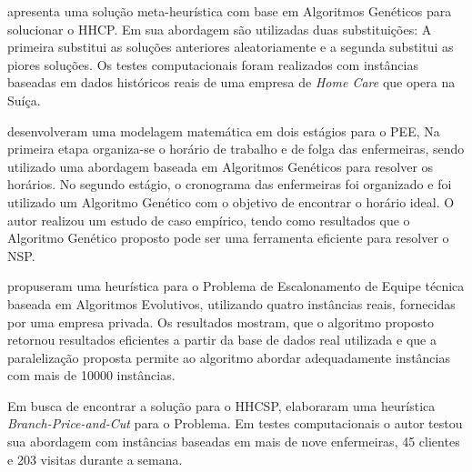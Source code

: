 \cite{nguyen:2016} apresenta uma solução meta-heurística com base em Algoritmos Genéticos para solucionar o \ac{HHCP}. Em sua abordagem são utilizadas duas substituições: A primeira substitui as soluções anteriores aleatoriamente e a segunda substitui as piores soluções. Os testes computacionais foram realizados com instâncias baseadas em dados históricos reais de uma empresa de \textit{Home Care} que opera na Suíça.



\cite{tsai:2009} desenvolveram uma modelagem matemática em dois estágios para o \ac{PEE}, Na primeira etapa organiza-se o horário de trabalho e de folga das enfermeiras,  sendo utilizado uma abordagem baseada em Algoritmos Genéticos para resolver os horários. No segundo estágio, o cronograma das enfermeiras foi organizado e foi utilizado um  Algoritmo Genético com o objetivo de encontrar o horário ideal. O autor realizou um estudo de caso empírico, tendo como resultados que o Algoritmo Genético proposto pode ser uma ferramenta eficiente para resolver o \ac{NSP}.

 \cite{luna:2013} propuseram uma heurística para o Problema de Escalonamento de Equipe técnica baseada em Algoritmos Evolutivos, utilizando quatro instâncias reais, fornecidas por uma empresa privada. Os resultados mostram,  que o algoritmo proposto retornou resultados eficientes a partir da base de dados real utilizada e  que a paralelização proposta permite ao algoritmo abordar adequadamente instâncias com mais de 10000 instâncias. 

Em busca de encontrar a solução para o \ac{HHCSP}, \cite{trautsamwieser:2014} elaboraram uma heurística  \textit{Branch-Price-and-Cut} para o Problema. Em testes computacionais o autor testou sua abordagem com instâncias baseadas em mais de nove enfermeiras, 45 clientes e 203 visitas durante a semana.

